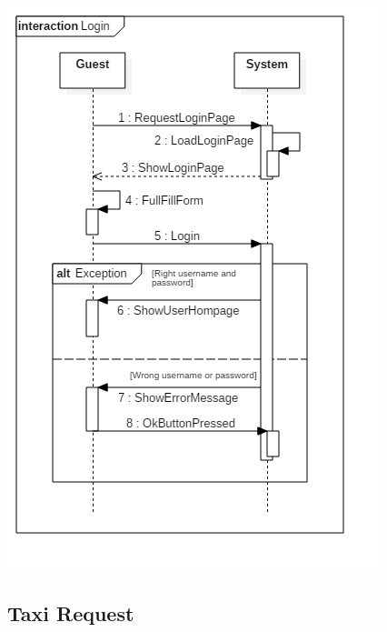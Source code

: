 \documentclass[english]{article}
\begin{document}
\includegraphics[width=\textwidth]{Login}

\subsection{Taxi Request}
\end{document}
